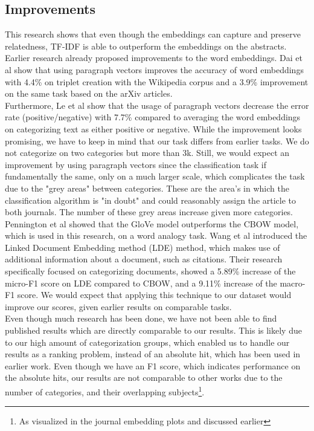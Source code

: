 \documentclass[runningheads]{llncs}
\begin{document}
\subsection{Improvements}
This research shows that even though the embeddings can capture and preserve relatedness, TF-IDF is able to outperform the embeddings on the abstracts. Earlier research already proposed improvements to the word embeddings. Dai et al\cite{dai2015document} show that using paragraph vectors improves the accuracy of word embeddings with 4.4\% on triplet creation with the Wikipedia corpus and a 3.9\% improvement on the same task based on the arXiv articles.\\
Furthermore, Le et al\cite{le2014distributed} show that the usage of paragraph vectors decrease the error rate (positive/negative) with 7.7\% compared to averaging the word embeddings on categorizing text as either positive or negative. While the improvement looks promising, we have to keep in mind that our task differs from earlier tasks. We do not categorize on two categories but more than 3k. Still, we would expect an improvement by using paragraph vectors since the classification task if fundamentally the same, only on a much larger scale, which complicates the task due to the "grey areas"  between categories. These are the area's in which the classification algorithm is "in doubt" and could reasonably assign the article to both journals. The number of these grey areas increase given more categories. Pennington et al\cite{pennington2014glove} showed that the GloVe model outperforms the CBOW model, which is used in this research, on a word analogy task. Wang et al\cite{wang2016linked} introduced the Linked Document Embedding method (LDE) method, which makes use of additional information about a document, such as citations. Their research specifically focused on categorizing documents, showed a 5.89\% increase of the micro-F1 score on LDE compared to CBOW, and a 9.11\% increase of the macro-F1 score. We would expect that applying this technique to our dataset would improve our scores, given earlier results on comparable tasks.\\
Even though much research has been done, we have not been able to find published results which are directly comparable to our results. This is likely due to our high amount of categorization groups, which enabled us to handle our results as a ranking problem, instead of an absolute hit, which has been used in earlier work\cite{wang2016linked}. Even though we have an F1 score, which indicates performance on the absolute hits, our results are not comparable to other works due to the number of categories, and their overlapping subjects\footnote{As visualized in the journal embedding plots and discussed earlier}.
\end{document}
